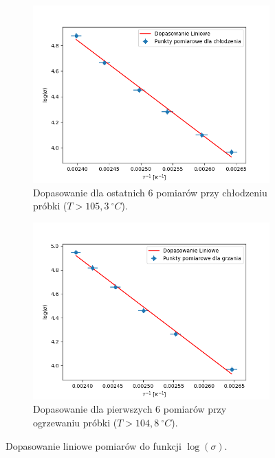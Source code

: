 \documentclass[12pt]{article}
\begin{document}
\begin{figure}[H]
  \centering
  \begin{subfigure}[b]{0.45\textwidth}
    \includegraphics[width=\textwidth]{temp_cooling_fit}
    \caption{Dopasowanie dla ostatnich 6 pomiarów przy chłodzeniu próbki ($T>105{,}3 \ ^{\circ}C$).}
    \label{fig:temp_cooling_fit}
  \end{subfigure}
  \hfill
  \begin{subfigure}[b]{0.45\textwidth}
    \includegraphics[width=\textwidth]{temp_heating_fit}
    \caption{Dopasowanie dla pierwszych 6 pomiarów przy ogrzewaniu próbki ($T>104{,}8 \ ^{\circ}C$).}
    \label{fig:temp_heating_fit}
  \end{subfigure}
  \caption{Dopasowanie liniowe pomiarów do funkcji $\log(\sigma)$.}
  \label{fig:temp_fits}
\end{figure}
\end{document}
